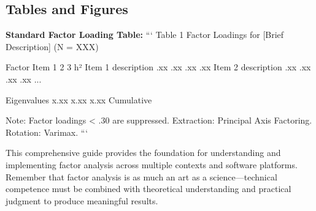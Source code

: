 \documentclass[a4paper]{tufte-book}
\begin{document}
\subsection{Tables and Figures}

\textbf{Standard Factor Loading Table:}
```
Table 1
Factor Loadings for [Brief Description] (N = XXX)

                        Factor
Item                    1     2     3    h²
Item 1 description    .xx   .xx   .xx   .xx
Item 2 description    .xx   .xx   .xx   .xx
...

Eigenvalues          x.xx  x.xx  x.xx
Cumulative %

Note: Factor loadings < .30 are suppressed. 
Extraction: Principal Axis Factoring. 
Rotation: Varimax.
```

This comprehensive guide provides the foundation for understanding and implementing factor analysis across multiple contexts and software platforms. Remember that factor analysis is as much an art as a science—technical competence must be combined with theoretical understanding and practical judgment to produce meaningful results.
\end{document}
